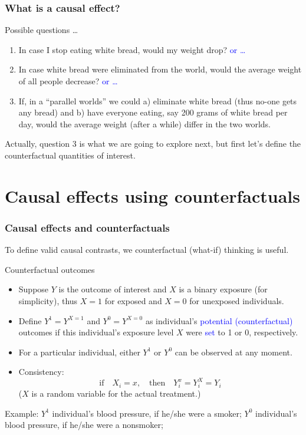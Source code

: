 \documentclass[10pt,dvipsnames,t,handout%
,aspectratio=169%
]{beamer}%
\newcommand{\sini}[1]{\textcolor{Blue}{#1}}
\newcommand{\puna}[1]{\textcolor{BrickRed}{#1}}
\begin{document}
\begin{frame}
	\frametitle{What is a causal effect?}
	\begin{block}{Possible questions \ldots}
		 	\begin{enumerate}
		\item In case I stop eating white bread, would my weight drop?  \quad \sini{or \ldots} 
		\item In case white bread were eliminated from the world, would the average weight of all people decrease?  \quad \sini{or \ldots} 
		\item If, in a ``parallel worlds'' we could a) eliminate white bread (thus no-one gets any bread) and b) have everyone eating, say 200 grams of white bread per day, would the average weight (after a while) differ in the two worlds. 
	\end{enumerate}
			\end{block}
		Actually, question 3 is what we are going to explore next, but first let's define the counterfactual quantities of interest.
\end{frame}

\section{Causal effects using counterfactuals}

\begin{frame}
\frametitle{Causal effects and counterfactuals}


To define valid causal contrasts, we \puna{counterfactual} (what-if) thinking is useful.
\begin{block}{Counterfactual outcomes}
\begin{itemize}
\item Suppose $Y$ is the outcome of interest and  $X$ is a binary exposure (for simplicity), thus $X=1$ for exposed and $X=0$ for unexposed individuals.
\item Define $Y^1=Y^{X=1}$ and $Y^0=Y^{X=0}$  as individual's \sini{potential (counterfactual)} outcomes if this individual's exposure level $X$ were \sini{set} to 1 or 0, respectively. 
\item For a particular individual, either $Y^1$ or $Y^0$ can be observed at any moment. 
\item Consistency: 
$$\text{if} \quad X_i=x, \quad \text{then} \quad Y_i^x=Y_i^X=Y_i$$
($X$ is a random variable for the actual treatment.)
\end{itemize}
\end{block}
Example: $Y^1$ individual's blood pressure, if he/she were a smoker; $Y^0$ individual's blood pressure, if he/she were a nonsmoker;

\end{frame}
\end{document}
